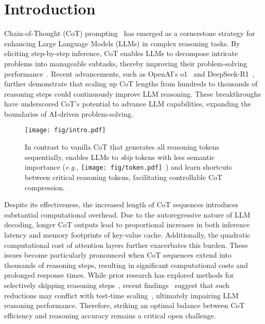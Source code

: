 \section{Introduction}

Chain-of-Thought (CoT) prompting~\cite{Nye:2021, cot, Kojima:2022cotzero} has emerged as a cornerstone strategy for enhancing Large Language Models (LLMs) in complex reasoning tasks. By eliciting step-by-step inference, CoT enables LLMs to decompose intricate problems into manageable subtasks, thereby improving their problem-solving performance~\cite{Yao:2023tot, Wang:2023self-consistency, Zhou:2023least, Shinn:2023Reflexion}. Recent advancements, such as OpenAI's o1~\cite{o1} and DeepSeek-R1~\cite{deepseekr1}, further demonstrate that scaling up CoT lengths from hundreds to thousands of reasoning steps could continuously improve LLM reasoning. These breakthroughs have underscored CoT’s potential to advance LLM capabilities, expanding the boundaries of AI-driven problem-solving.

\begin{figure}[t]
\centering
    \texttt{[image: fig/intro.pdf]}
    \caption{In contrast to vanilla CoT that generates all reasoning tokens sequentially, \method enables LLMs to \textit{skip} tokens with less semantic importance (\textit{e.g.,} \texttt{[image: fig/token.pdf]}~) and learn shortcuts between critical reasoning tokens, facilitating controllable CoT compression.}
    \label{fig:intro}
\end{figure}

Despite its effectiveness, the increased length of CoT sequences introduces substantial computational overhead. Due to the autoregressive nature of LLM decoding, longer CoT outputs lead to proportional increases in both inference latency and memory footprints of key-value cache. Additionally, the quadratic computational cost of attention layers further exacerbates this burden. These issues become particularly pronounced when CoT sequences extend into thousands of reasoning steps, resulting in significant computational costs and prolonged response times. While prior research has explored methods for selectively skipping reasoning steps~\cite{Ding:2024cotshortcut, liu2024skipstep}, recent findings~\cite{jin:2024cotlength, Merrill:2024cotlength} suggest that such reductions may conflict with test-time scaling~\cite{o1-blog, snell2025scaling}, ultimately impairing LLM reasoning performance. Therefore, striking an optimal balance between CoT efficiency and reasoning accuracy remains a critical open challenge.

